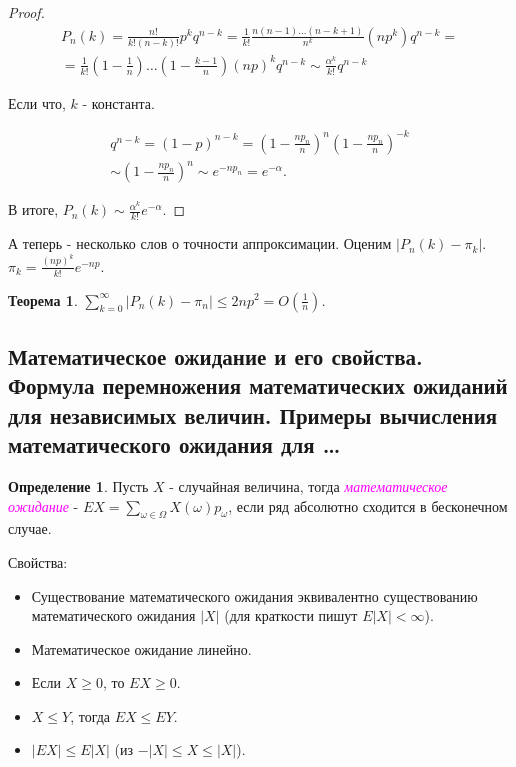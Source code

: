 \documentclass[a4paper,100pt]{article}
\theoremstyle{indented}
\newtheorem{theorem}{Теорема}
\theoremstyle{definition}
\newtheorem{defn}{Определение}
\theoremstyle{remark}
\begin{document}
\begin{proof}
  \begin{equation*}
      \begin{split}
          P_n(k)=\frac{n!}{k!(n-k)!}p^kq^{n-k}=\frac{1}{k!}\frac{n(n-1)\ldots(n-k+1)}{n^k}(np^k)q^{n-k}= \\ 
          = \frac{1}{k!}{(1-\frac{1}{n})\ldots(1-\frac{k-1}{n})}(np)^kq^{n-k}\sim\frac{\alpha^k}{k!}q^{n-k}
      \end{split}
  \end{equation*}

  Если что, $k$ - константа. 

  \begin{equation*}
      \begin{split}
          q^{n-k}=(1-p)^{n-k}=(1-\frac{n p_n}{n})^n(1-\frac{n p_n}{n})^{-k} \\ 
          \sim (1-\frac{n p_n}{n})^n \sim e^{-n p_n} = e^{-\alpha}. 
      \end{split}
  \end{equation*}

  В итоге, $P_n(k)\sim\frac{\alpha^k}{k!}e^{-\alpha}$. 

\end{proof}

А теперь - несколько слов о точности аппроксимации. Оценим $|P_n(k)-\pi_k|$. $\pi_k=\frac{(np)^k}{k!}e^{-np}$. \\

\begin{theorem}
  $\sum_{k=0}^\infty|P_n(k)-\pi_n|\leq 2np^2 = O(\frac{1}{n})$.
\end{theorem}

\subsection{Математическое ожидание и его свойства. Формула перемножения математических ожиданий для независимых величин. Примеры вычисления математического ожидания для \ldots} 

\begin{defn}
  Пусть $X$ - случайная величина, тогда \hypertarget{n13}{\textcolor{magenta}{\textit{математическое ожидание}}} - $EX = \sum_{\omega \in \Omega} X(\omega)p_\omega$, если ряд абсолютно сходится в бесконечном случае.
\end{defn}

Свойства: \\ 

\begin{itemize}
  \item Существование математического ожидания эквивалентно существованию математического ожидания $|X|$ (для краткости пишут $E|X|<\infty$). 
  \item Математическое ожидание линейно.
  \item Если $X\geq 0$, то $EX\geq 0$. 
  \item $X\leq Y$, тогда $EX\leq EY$. 
  \item $|EX|\leq E|X|$ (из $-|X|\leq X \leq |X|$). 
\end{itemize}
\end{document}
